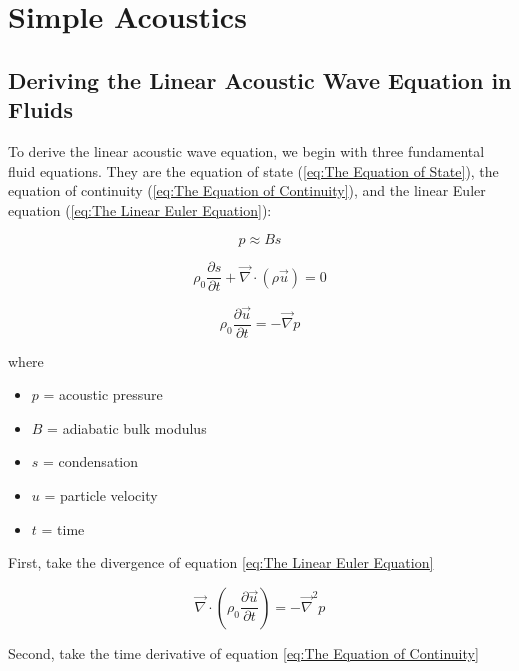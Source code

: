 \documentclass{book}
\begin{document}
\tableofcontents

\chapter{Simple Acoustics}

\section{Deriving the Linear Acoustic Wave Equation in Fluids}

To derive the linear acoustic wave equation, we begin with three fundamental fluid equations. They are the equation of state (\ref{eq:The Equation of State}), the equation of continuity (\ref{eq:The Equation of Continuity}), and the linear Euler equation (\ref{eq:The Linear Euler Equation}):

\begin{equation} \label{eq:The Equation of State}
    p \approx B s
\end{equation}

\begin{equation} \label{eq:The Equation of Continuity}
    \rho_0 \frac{\partial s}{\partial t} + \vec{\nabla} \cdot (\rho \vec{u}) = 0
\end{equation}

\begin{equation} \label{eq:The Linear Euler Equation}
    \rho_0 \frac{\partial \vec{u}}{\partial t} = - \vec{\nabla} p
\end{equation}

where

\begin{itemize}
    \item $p$ = acoustic pressure
    \item $B$ = adiabatic bulk modulus
    \item $s$ = condensation
    \item $u$ = particle velocity
    \item $t$ = time
\end{itemize}

First, take the divergence of equation \ref{eq:The Linear Euler Equation}

\begin{equation} \label{eq:Divergence of Linear Euler Equation}
    \vec{\nabla} \cdot \left( \rho_0 \frac{\partial \vec{u}}{\partial t} \right) = -\vec{\nabla}^2 p
\end{equation}

Second, take the time derivative of equation \ref{eq:The Equation of Continuity}
\end{document}
